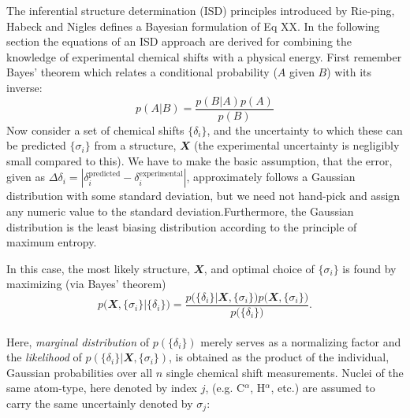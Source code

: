 The inferential structure determination (ISD) principles introduced by Rie-ping, Habeck and Nigles \cite{Rieping2005}defines a Bayesian formulation of Eq XX. In the following section the equations of an ISD approach are derived for combining the knowledge of experimental chemical shifts with a physical energy. First remember Bayes' theorem which relates a conditional probability ($A$ given $B$) with its inverse:
\begin{equation}
p\left(A | B \right) =\frac{p\left(B | A \right)p\left(A\right)}{p\left(B \right)} 
\end{equation}
Now consider a set of chemical shifts $\{\delta_i\}$, and the uncertainty to which these can be predicted $\{\sigma_i\}$ from a structure, $\mathbfit X$ (the experimental uncertainty is negligibly small compared to this). We have to make the basic assumption, that the error, given as $\Delta\delta_i = \left| \delta_i^{\mathrm{predicted}} - \delta_i^{\mathrm{experimental}}\right|$, approximately follows a Gaussian distribution with some standard deviation, but we need not hand-pick and assign any numeric value to the standard deviation.Furthermore, the Gaussian distribution is the least biasing distribution according to the principle of maximum entropy.


In this case, the most likely structure, $\mathbfit X$, and optimal choice of $\{\sigma_i\}$ is found by maximizing (via Bayes' theorem)
\begin{equation}
p\Big(\mathbfit X, \{\sigma_i\} \Big| \{\delta_i\} \Big) = \frac{p\Big( \{\delta_i\} \Big| \mathbfit X, \{\sigma_i\}\Big)p\Big(\mathbfit X, \{\sigma_i\} \Big)}{p\Big( \{\delta_i\}\Big)}.
\end{equation}\\
Here, \textit{marginal distribution} of $p\left( \{\delta_i\}\right)$ merely serves as a normalizing factor and the \textit{likelihood} of $p\left( \{\delta_i\} | \mathbfit X, \{\sigma_i\}\right)$, is obtained as the product of the individual, Gaussian probabilities over all $n$ single chemical shift measurements. Nuclei of the same atom-type, here denoted by index $j$, (e.g. C$^\alpha$, H$^\alpha$, etc.) are assumed to carry the same uncertainly denoted by $\sigma_j$:

